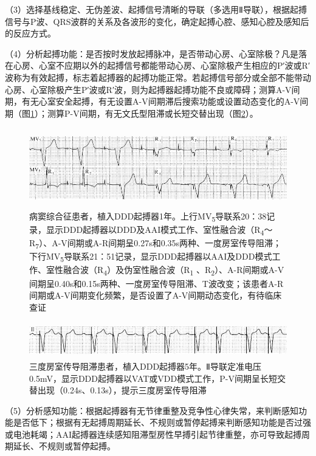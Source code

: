 （3）选择基线稳定、无伪差波、起搏信号清晰的导联（多选用Ⅱ导联），根据起搏信号与P波、QRS波群的关系及各波形的变化，确定起搏心腔、感知心腔及感知后的反应方式。

（4）分析起搏功能：是否按时发放起搏脉冲，是否带动心房、心室除极？凡是落在心房、心室不应期以外的起搏信号都能带动心房、心室除极产生相应的P′波或R′波称为有效起搏，标志着起搏器的起搏功能正常。若起搏信号部分或全部不能带动心房、心室除极产生P′波或R′波，则为起搏器起搏功能不良或障碍；测算A-V间期，有无心室安全起搏，有无设置A-V间期滞后搜索功能或设置动态变化的A-V间期（图\ref{fig38-43}）；测算P-V间期，有无文氏型阻滞或长短交替出现（图\ref{fig38-44}）。

\begin{figure}[!htbp]
 \centering
 \includegraphics[width=5.58333in,height=1.36458in]{./images/Image00646.jpg}
 \captionsetup{justification=centering}
 \caption{病窦综合征患者，植入DDD起搏器1年。上行MV\textsubscript{5}导联系20：38记录，显示DDD起搏器以DDD及AAI模式工作、室性融合波（R\textsubscript{4}～R\textsubscript{7}）、A-V间期或A-R间期呈0.27s和0.35s两种、一度房室传导阻滞；下行MV\textsubscript{5}导联系21：51记录，显示DDD起搏器以AAI及DDD模式工作、室性融合波（R\textsubscript{4}）及伪室性融合波（R\textsubscript{1} 、R\textsubscript{2}）、A-R间期或A-V间期呈0.40s和0.15s两种、一度房室传导阻滞、T波改变；该患者A-R间期或A-V间期变化频繁，是否设置了A-V间期动态变化，有待临床查证}
 \label{fig38-43}
  \end{figure} 


\begin{figure}[!htbp]
 \centering
 \includegraphics[width=5.58333in,height=0.61458in]{./images/Image00647.jpg}
 \captionsetup{justification=centering}
 \caption{三度房室传导阻滞患者，植入DDD起搏器5年。Ⅱ导联定准电压0.5mV，显示DDD起搏器以VAT或VDD模式工作，P-V间期呈长短交替出现（0.24s、0.13s），提示三度房室传导阻滞}
 \label{fig38-44}
  \end{figure} 

（5）分析感知功能：根据起搏器有无节律重整及竞争性心律失常，来判断感知功能是否低下；根据有无起搏周期延长、不规则或暂停起搏来判断感知功能是否过强或电池耗竭；AAI起搏器连续感知阻滞型房性早搏引起节律重整，亦可导致起搏周期延长、不规则或暂停起搏。

